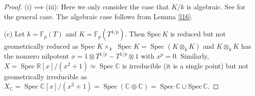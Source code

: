 \begin{proof}
	(i)$\implies$(iii): Here we only consider the case that $K/k$ is algebraic. See \cite[\href{https://stacks.math.columbia.edu/tag/035U}{Tag 035U}, Lemma 33.6.4]{stacks-project} for the general case. The algebraic case follows from Lemma \ref{l16}.
	
	(c) Let $k=\mathbb{F}_{p}(T)$ and $K=\mathbb{F}_{p}\left(T^{1 / p}\right)$. Then $\mathrm{Spec}\,K$ is reduced but not geometrically reduced as Spec $K \times_{k}$ $\operatorname{Spec} K=\operatorname{Spec}\left(K \otimes_{k} K\right)$ and $K \otimes_{k} K$ has the nonzero nilpotent $x=1 \otimes T^{1 / p}-T^{1 / p} \otimes 1$ with $x^{p}=0$. Similarly, $X=\operatorname{Spec} \mathbb{R}[x] /\left(x^{2}+1\right) \simeq \operatorname{Spec} \mathbb{C}$ is irreducible (it is a single point) but not geometrically irreducible as $X_{\mathbb{C}}=\operatorname{Spec} \mathbb{C}[x] /\left(x^{2}+1\right)=\operatorname{Spec}(\mathbb{C} \oplus \mathbb{C})=\operatorname{Spec} \mathbb{C}\sqcup\mathrm{Spec}\,\mathbb{C}$.
\end{proof}